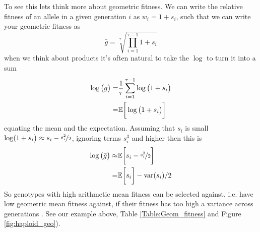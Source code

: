 To see this lets think more about geometric fitness. We can write the
relative fitness of an allele in a given generation $i$ as $w_{i}= 1+s_i$, such that we can
write your geometric fitness as
\begin{equation}
 \bar{g}= \sqrt[\tau]{\prod_{i=1}^{\tau-1} 1+s_i}  \label{hap_geo_fitness_bh}
  \end{equation}
when we think about products it's often natural to take the $\log$ to
turn it into a sum
\begin{align}
 \log \big( \bar{g} \big) =& \frac{1}{\tau} \sum_{i=1}^{\tau-1} \log \big(1+s_i \big) \nonumber\\
  = & \mathbb{E} \bigg[ \log \big( 1+s_i \big) \bigg]
\end{align}
equating the mean and the expectation. Assuming that $s_i$ is small $\log(1+s_i \big) \approx s_i -
\nicefrac{s_i^2}{2}$, ignoring terms $s_i^3$ and
higher then this is
\begin{align}
  \log \big( \bar{g}  \big) \approx & \mathbb{E}\bigg[  s_i -\nicefrac{s_i^2}{2}  \bigg]  \nonumber\\
  =  & \mathbb{E} \bigg[  s_i \bigg]  - \textrm{var}(s_i)/2 \nonumber\\
\end{align}
So genotypes with high arithmetic mean fitness can be selected against,
i.e. have low geometric mean fitness against, if their fitness has too
high a variance across generations \citep{gillespie1973natural,gillespie1977natural}. See our example
above,  Table \ref{Table:Geom_fitness} and Figure \ref{fig:haploid_geo}).

